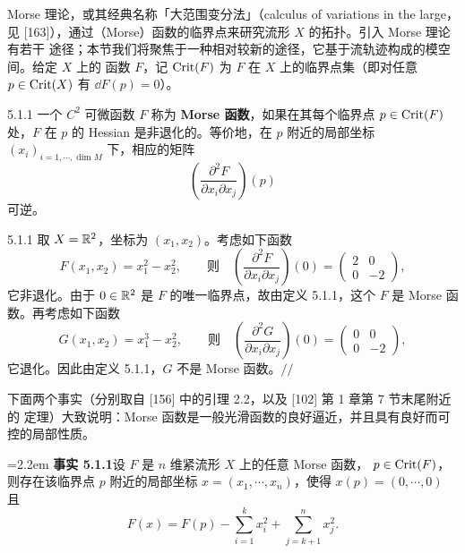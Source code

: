 Morse 理论，或其经典名称「大范围变分法」（calculus of variations in the large，
见 [163]），通过（Morse）函数的临界点来研究流形 $X$ 的拓扑。引入 Morse 理论有若干
途径；本节我们将聚焦于一种相对较新的途径，它基于流轨迹构成的模空间。给定 $X$ 上的
函数 $F$，记 $\operatorname{Crit}(F)$ 为 $F$ 在 $X$ 上的临界点集（即对任意 $p\in\operatorname{Crit}(X)$ 有
$\dd F(p)=0$）。


\begin{wdefn}{5.1.1}
一个 $C^2$ 可微函数 $F$ 称为 \textbf{Morse 函数}，如果在其每个临界点
$p\in\operatorname{Crit}(F)$ 处，$F$ 在 $p$ 的 Hessian 是非退化的。等价地，在 $p$ 附近的局部坐标
$(x_i)_{i=1,\cdots,\dim M}$ 下，相应的矩阵
\[
\left(\frac{\partial^2 F}{\partial x_i\partial x_j}\right)(p)
\]
可逆。
\end{wdefn}


\begin{wexam}{5.1.1}
取 $X=\mathbb{R}^2$，坐标为 $(x_1,x_2)$。考虑如下函数
\[
F(x_1,x_2)=x_1^2-x_2^2,\qquad\text{则}\quad
\left(\frac{\partial^2 F}{\partial x_i\partial x_j}\right)(0)
=\begin{pmatrix}2&0\\0&-2\end{pmatrix},
\]
它非退化。由于 $0\in\mathbb{R}^2$ 是 $F$ 的唯一临界点，故由定义 5.1.1，这个 $F$ 是 Morse
函数。再考虑如下函数
\[
G(x_1,x_2)=x_1^3-x_2^2,\qquad\text{则}\quad
\left(\frac{\partial^2 G}{\partial x_i\partial x_j}\right)(0)
=\begin{pmatrix}0&0\\0&-2\end{pmatrix},
\]
它退化。因此由定义 5.1.1，$G$ 不是 Morse 函数。\hfill$//$
\end{wexam}

下面两个事实（分别取自 [156] 中的引理 2.2，以及 [102] 第 1 章第 7 节末尾附近的
定理）大致说明：Morse 函数是一般光滑函数的良好逼近，并且具有良好而可控的局部性质。

\par\medskip\noindent\hangindent=2.2em
\textbf{事实 5.1.1}\quad 设 $F$ 是 $n$ 维紧流形 $X$ 上的任意 Morse 函数，
$p\in\operatorname{Crit}(F)$，则存在该临界点 $p$ 附近的局部坐标 $x=(x_1,\cdots,x_n)$，使得
$x(p)=(0,\cdots,0)$ 且
\begin{equation}\tag{5.1}
F(x)=F(p)-\sum_{i=1}^{k}x_i^2+\sum_{j=k+1}^{n}x_j^2.
\end{equation}

